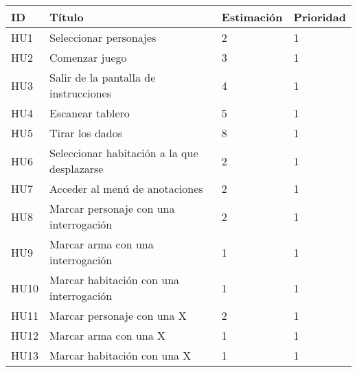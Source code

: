 
\begin{table}[h]
  \begin{center}
    \begin{tabular}{|p{1cm}|p{7.5cm}|p{1.9cm}|p{1.6cm}|}

      \hline
        \rowcolor{Gray} \textbf{ID}
        & \textbf{Título}
        & \textbf{Estimación}
        & \textbf{Prioridad}\\

      \hline
      HU1
      & Seleccionar personajes
      & 2
      & 1\\

      \hline
      HU2
      & Comenzar juego
      & 3
      & 1\\

      \hline
      HU3
      & Salir de la pantalla de instrucciones
      & 4
      & 1\\

      \hline
      HU4
      & Escanear tablero
      & 5
      & 1\\

      \hline
      HU5
      & Tirar los dados
      & 8
      & 1\\

      \hline
      HU6
      & Seleccionar habitación a la que desplazarse
      & 2
      & 1\\

      \hline
      HU7
      & Acceder al menú de anotaciones
      & 2
      & 1\\

      \hline
      HU8
      & Marcar personaje con una interrogación
      & 2
      & 1\\

      \hline
      HU9
      & Marcar arma con una interrogación
      & 1
      & 1\\

      \hline
      HU10
      & Marcar habitación con una interrogación
      & 1
      & 1\\

      \hline
      HU11
      & Marcar personaje con una X
      & 2
      & 1\\

      \hline
      HU12
      & Marcar arma con una X
      & 1
      & 1\\

      \hline
      HU13
      & Marcar habitación con una X
      & 1
      & 1\\


\end{tabular}
\end{center}
\end{table}
